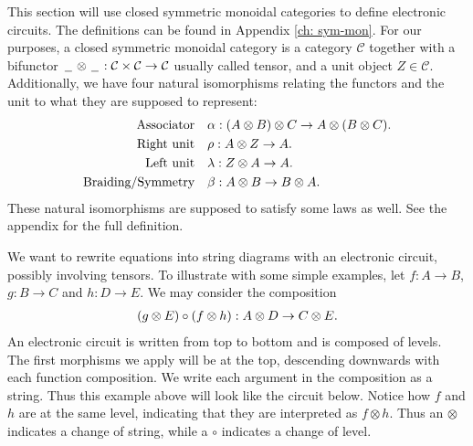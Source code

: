 \documentclass[../thesis.tex]{subfiles}
\begin{document}
            This section will use closed symmetric monoidal categories to define electronic circuits. The definitions can be found in Appendix \ref{ch: sym-mon}. For our purposes, a closed symmetric monoidal category is a category $\mathcal{C}$ together with a bifunctor $\argument\otimes\argument: \mathcal{C}\times\mathcal{C}\rightarrow\mathcal{C}$ usually called tensor, and a unit object $Z\in \mathcal{C}$. Additionally, we have four natural isomorphisms relating the functors and the unit to what they are supposed to represent:
            \begin{align*}
                \tt{Associator} & \quad \alpha : (A \otimes B) \otimes C \rightarrow A \otimes (B \otimes C)\tt{.}\\
                \tt{Right unit} & \quad \rho : A \otimes Z \rightarrow A\tt{.}\\
                \tt{Left unit} & \quad \lambda : Z \otimes A \rightarrow A\tt{.}\\
                \tt{Braiding/Symmetry} & \quad \beta : A \otimes B \rightarrow B \otimes A\tt{.}
            \end{align*}
            These natural isomorphisms are supposed to satisfy some laws as well. See the appendix for the full definition.

            We want to rewrite equations into string diagrams with an electronic circuit, possibly involving tensors. To illustrate with some simple examples, let $f: A \rightarrow B$, $g: B \rightarrow C$ and $h : D \rightarrow E$. We may consider the composition
            \begin{align*}
                (g \otimes E) \circ (f \otimes h) : A \otimes D \rightarrow C \otimes E \tt{.}
            \end{align*}
            An electronic circuit is written from top to bottom and is composed of levels. The first morphisms we apply will be at the top, descending downwards with each function composition. We write each argument in the composition as a string. Thus this example above will look like the circuit below. Notice how $f$ and $h$ are at the same level, indicating that they are interpreted as $f \otimes h$. Thus an $\otimes$ indicates a change of string, while a $\circ$ indicates a change of level.
            
            \begin{center}
            \end{center}
\end{document}

